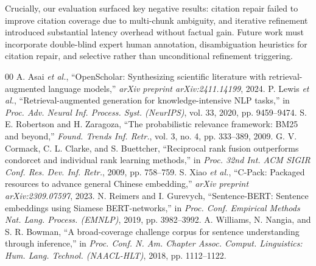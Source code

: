 \documentclass[conference]{IEEEtran}
\begin{document}
Crucially, our evaluation surfaced key negative results: citation repair failed to improve citation coverage due to multi-chunk ambiguity, and iterative refinement introduced substantial latency overhead without factual gain. Future work must incorporate double-blind expert human annotation, disambiguation heuristics for citation repair, and selective rather than unconditional refinement triggering.

\begin{thebibliography}{00}
 A. Asai \textit{et al.}, ``OpenScholar: Synthesizing scientific literature with retrieval-augmented language models,'' \textit{arXiv preprint arXiv:2411.14199}, 2024.
 P. Lewis \textit{et al.}, ``Retrieval-augmented generation for knowledge-intensive NLP tasks,'' in \textit{Proc. Adv. Neural Inf. Process. Syst. (NeurIPS)}, vol. 33, 2020, pp. 9459--9474.
 S. E. Robertson and H. Zaragoza, ``The probabilistic relevance framework: BM25 and beyond,'' \textit{Found. Trends Inf. Retr.}, vol. 3, no. 4, pp. 333--389, 2009.
 G. V. Cormack, C. L. Clarke, and S. Buettcher, ``Reciprocal rank fusion outperforms condorcet and individual rank learning methods,'' in \textit{Proc. 32nd Int. ACM SIGIR Conf. Res. Dev. Inf. Retr.}, 2009, pp. 758--759.
 S. Xiao \textit{et al.}, ``C-Pack: Packaged resources to advance general Chinese embedding,'' \textit{arXiv preprint arXiv:2309.07597}, 2023.
 N. Reimers and I. Gurevych, ``Sentence-BERT: Sentence embeddings using Siamese BERT-networks,'' in \textit{Proc. Conf. Empirical Methods Nat. Lang. Process. (EMNLP)}, 2019, pp. 3982--3992.
 A. Williams, N. Nangia, and S. R. Bowman, ``A broad-coverage challenge corpus for sentence understanding through inference,'' in \textit{Proc. Conf. N. Am. Chapter Assoc. Comput. Linguistics: Hum. Lang. Technol. (NAACL-HLT)}, 2018, pp. 1112--1122.
\end{thebibliography}
\end{document}
